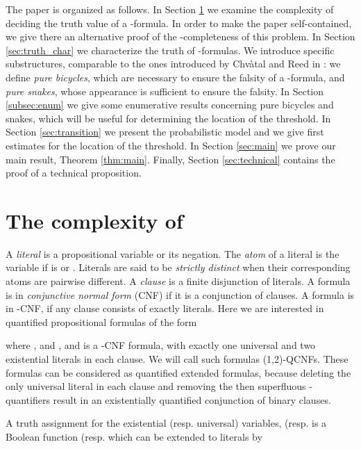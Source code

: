 \documentclass[aop,noinfoline]{imsart}
\newcommand{\onetwo}{(1,2)}
\newcommand{\onetwoqcnf}{\mbox{\sf \onetwo-QCNF}}
\begin{document}
The paper is organized as follows. In Section \ref{sec:complexity} we
examine the complexity of deciding the truth value of a
-formula. In order to make the paper self-contained, we
give there an alternative proof of the -completeness of this
problem.  In Section \ref{sec:truth_char} we characterize the truth of
-formulas. We introduce specific substructures,
comparable to the ones introduced by Chv\`atal and Reed in
\cite{ChvatalR-92}: we define \textit{pure bicycles}, which are
necessary to ensure the falsity of a -formula, and
\textit{pure snakes}, whose appearance is sufficient to ensure the
falsity. In Section \ref{subsec:enum} we give some enumerative results
concerning pure bicycles and snakes, which will be useful for
determining the location of the threshold.  In Section
\ref{sec:transition} we present the probabilistic model and we  give first
estimates for the location of the threshold. In Section \ref{sec:main} we prove our main
result, Theorem \ref{thm:main}. Finally, Section \ref{sec:technical}
contains the proof of a technical proposition.



\section{ The complexity of  }\label{sec:complexity}



 A \emph{literal}\/ is a propositional variable or its negation. The
\emph{atom}\/ of a literal  is the variable  if  is  or . Literals are said to be \emph{strictly distinct } when their corresponding atoms are pairwise different.
 A \emph{clause}\/ is a finite disjunction of
literals.   A formula is in \emph{conjunctive
normal
  form}\/ (CNF) if it is a conjunction of clauses.
A formula is in -CNF, if any clause consists of exactly 
literals.  Here we are interested in quantified propositional 
formulas of the form

where , and , and
 is a -CNF formula, with exactly one universal
and two existential literals in each clause.  We will call such
formulas \onetwoqcnf{}s. These formulas can be considered as
quantified extended  formulas, because deleting the only
universal literal in each clause and removing the then superfluous
-quantifiers result in an existentially quantified
conjunction of binary clauses. 

A truth assignment for the existential (resp. universal) variables,  (resp.  is a Boolean function  (resp.  which can be extended   to literals by  
\end{document}
